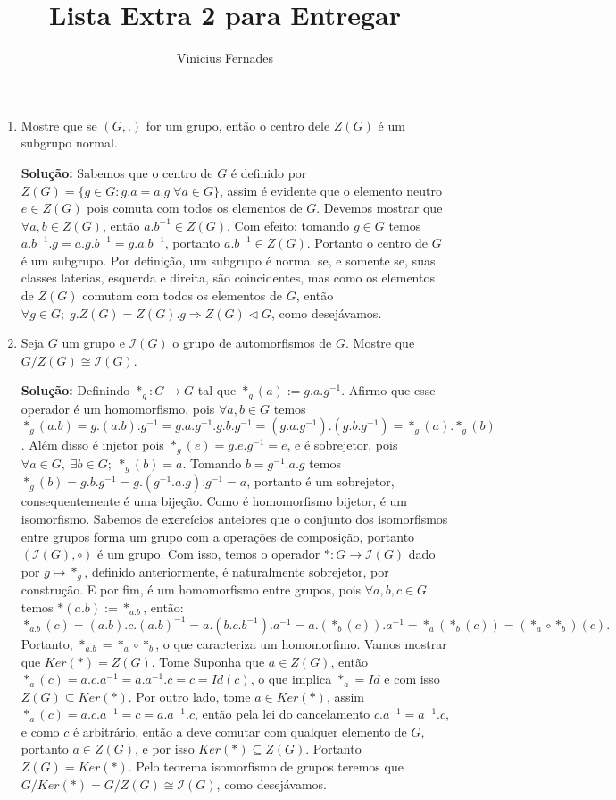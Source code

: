 \documentclass{article}
\begin{document}
	
\title{Lista Extra 2 para Entregar}
\author{Vinicius Fernades}
	
\maketitle
	
\begin{enumerate}
	\item Mostre que se $(G,.)$ for um grupo, então o centro dele $Z(G)$ é um subgrupo normal.
	
	\textbf{Solução:} Sabemos que o centro de $G$ é definido por $Z(G)=\{g \in G: g.a=a.g \; \forall a \in G\}$, assim é evidente que o elemento neutro $e \in Z(G)$ pois comuta com todos os elementos de $G$. Devemos mostrar que $\forall a, b \in Z(G)$, então $a.b^{-1} \in Z(G)$. Com efeito: tomando $g \in G$ temos $a.b^{-1}.g = a.g.b^{-1}= g.a.b^{-1}$, portanto $a.b^{-1} \in Z(G)$. Portanto o centro de $G$ é um subgrupo. Por definição, um subgrupo é normal se, e somente se, suas classes laterias, esquerda e direita, são coincidentes, mas como os elementos de $Z(G)$ comutam com todos os elementos de $G$, então $\forall g \in G; \; g.Z(G) = Z(G).g \Rightarrow Z(G) \vartriangleleft G$, como desejávamos.
	
	\item Seja $G$ um grupo e $\mathcal{I}(G)$ o grupo de automorfismos de $G$. Mostre que $G/Z(G) \cong \mathcal{I}(G)$.
	
	\textbf{Solução:} Definindo $*_{g}:G \to G$ tal que $*_{g}(a):=g.a.g^{-1}$. Afirmo que esse operador é um homomorfismo, pois $\forall a, b \in G$ temos $*_{g}(a.b) = g.(a.b).g^{-1} = g.a.g^{-1}.g.b.g^{-1} = (g.a.g^{-1}).(g.b.g^{-1}) = *_{g}(a). *_{g}(b)$. Além disso é injetor pois $*_{g}(e) = g.e.g^{-1} = e$, e é sobrejetor, pois $\forall a \in G, \;   \exists b\in G; \; *_{g}(b) = a$. Tomando $b= g^{-1}.a.g$ temos $*_{g}(b) = g.b.g^{-1} = g.(g^{-1}.a.g).g^{-1} =a$, portanto é um sobrejetor, consequentemente é uma bijeção. Como é homomorfismo bijetor, é um isomorfismo.
	Sabemos de exercícios anteiores que o conjunto dos isomorfismos entre grupos forma um grupo com a operações de composição, portanto $(\mathcal{I}(G), \circ)$ é um grupo. Com isso, temos o operador $*:G \to \mathcal{I}(G)$ dado por $g \mapsto *_{g}$, definido anteriormente, é naturalmente sobrejetor, por construção. E por fim, é um homomorfismo entre grupos, pois $\forall a, b, c \in G$ temos $*(a.b):= *_{a.b}$, então: 
	$$
	*_{a.b}(c) = (a.b).c.(a.b)^{-1} = a.(b.c.b^{-1}).a^{-1} = a.(*_{b}(c)).a^{-1} = *_{a}(*_{b}(c)) = (*_{a}\circ*_{b})(c).
	$$
	Portanto, $*_{a.b}=*_{a}\circ*_{b}$, o que caracteriza um homomorfimo. Vamos mostrar que $Ker(*) = Z(G)$. Tome Suponha que $a \in Z(G)$, então $*_{a}(c) = a.c.a^{-1} = a.a^{-1}.c = c = Id(c)$, o que implica $*_{a} = Id$ e com isso $Z(G) \subseteq Ker(*)$. Por outro lado, tome $a \in Ker(*)$, assim $*_{a}(c) = a.c.a^{-1} = c = a.a^{-1}.c$, então pela lei do cancelamento $c.a^{-1} = a^{-1}.c$, e como $c$ é arbitrário, então a deve comutar com qualquer elemento de $G$, portanto $a \in Z(G)$, e por isso $Ker(*) \subseteq Z(G)$. Portanto $Z(G) = Ker(*)$. Pelo teorema isomorfismo de grupos teremos que $G/Ker(*) =  G/Z(G) \cong \mathcal{I}(G)$, como desejávamos.  
\end{enumerate}
		
\end{document}
